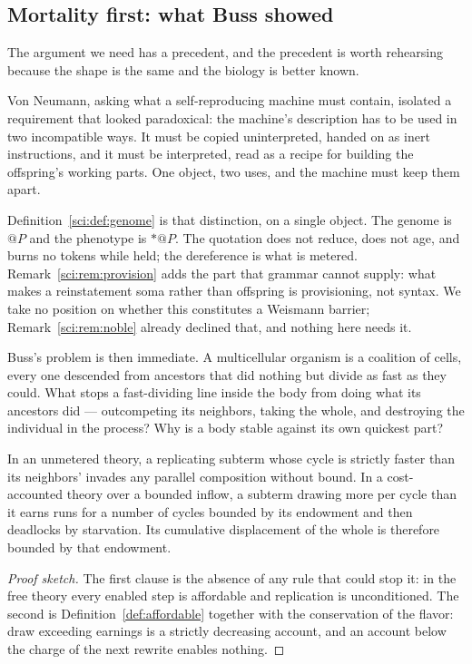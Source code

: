 \subsection{Mortality first: what Buss showed}
\label{suf:S5.1}

The argument we need has a precedent, and the precedent is worth
rehearsing because the shape is the same and the biology is better known.

Von Neumann, asking what a self-reproducing machine must contain, isolated
a requirement that looked paradoxical: the machine's description has to be
used in two incompatible ways.
It must be copied uninterpreted, handed on as inert instructions, and it
must be interpreted, read as a recipe for building the offspring's working
parts.
One object, two uses, and the machine must keep them apart.

Definition~\ref{sci:def:genome} is that distinction, on a single object.
The genome is $@P$ and the phenotype is $\ast @P$.
The quotation does not reduce, does not age, and burns no tokens while
held; the dereference is what is metered.
Remark~\ref{sci:rem:provision} adds the part that grammar cannot supply:
what makes a reinstatement soma rather than offspring is provisioning, not
syntax.
We take no position on whether this constitutes a Weismann barrier;
Remark~\ref{sci:rem:noble} already declined that, and nothing here needs
it.

Buss's problem is then immediate.
A multicellular organism is a coalition of cells, every one descended
from ancestors that did nothing but divide as fast as they could.
What stops a fast-dividing line inside the body from doing what its
ancestors did --- outcompeting its neighbors, taking the whole, and
destroying the individual in the process?
Why is a body stable against its own quickest part?

\begin{proposition}
\label{suf:prop:buss}
In an unmetered theory, a replicating subterm whose cycle is strictly
faster than its neighbors' invades any parallel composition without
bound.
In a cost-accounted theory over a bounded inflow, a subterm drawing more
per cycle than it earns runs for a number of cycles bounded by its
endowment and then deadlocks by starvation.
Its cumulative displacement of the whole is therefore bounded by that
endowment.
\end{proposition}

\begin{proof}[Proof sketch]
The first clause is the absence of any rule that could stop it: in the
free theory every enabled step is affordable and replication is
unconditioned.
The second is Definition~\ref{def:affordable} together with the
conservation of the flavor: draw exceeding earnings is a strictly
decreasing account, and an account below the charge of the next rewrite
enables nothing.
\end{proof}

